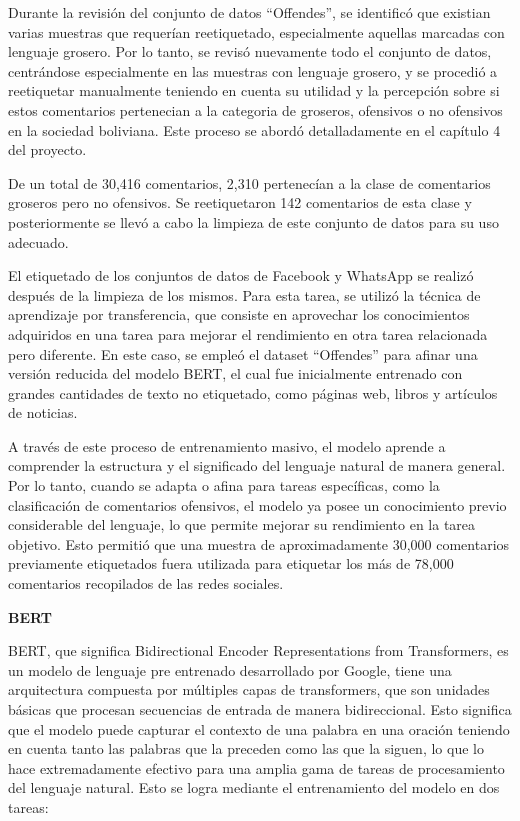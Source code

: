 Durante la revisión del conjunto de datos ``Offendes'', se identificó que existian varias muestras que requerían reetiquetado, especialmente aquellas marcadas con lenguaje grosero. Por lo tanto, se revisó nuevamente todo el conjunto de datos, centrándose especialmente en las muestras con lenguaje grosero, y se procedió a reetiquetar manualmente teniendo en cuenta su utilidad y la percepción sobre si estos comentarios pertenecian a la categoria de groseros, ofensivos o no ofensivos en la sociedad boliviana. Este proceso se abordó detalladamente en el capítulo 4 del proyecto.

De un total de 30,416 comentarios, 2,310 pertenecían a la clase de comentarios groseros pero no ofensivos. Se reetiquetaron 142 comentarios de esta clase y posteriormente se llevó a cabo la limpieza de este conjunto de datos para su uso adecuado.

El etiquetado de los conjuntos de datos de Facebook y WhatsApp se realizó después de la limpieza de los mismos. Para esta tarea, se utilizó la técnica de aprendizaje por transferencia, que consiste en aprovechar los conocimientos adquiridos en una tarea para mejorar el rendimiento en otra tarea relacionada pero diferente. En este caso, se empleó el dataset ``Offendes'' para afinar una versión reducida del modelo BERT, el cual fue inicialmente entrenado con grandes cantidades de texto no etiquetado, como páginas web, libros y artículos de noticias.

A través de este proceso de entrenamiento masivo, el modelo aprende a comprender la estructura y el significado del lenguaje natural de manera general. Por lo tanto, cuando se adapta o afina para tareas específicas, como la clasificación de comentarios ofensivos, el modelo ya posee un conocimiento previo considerable del lenguaje, lo que permite mejorar su rendimiento en la tarea objetivo. Esto permitió que una muestra de aproximadamente 30,000 comentarios previamente etiquetados fuera utilizada para etiquetar los más de 78,000 comentarios recopilados de las redes sociales.

\textbf{BERT}

BERT, que significa Bidirectional Encoder Representations from Transformers, es un modelo de lenguaje pre entrenado desarrollado por Google, tiene una arquitectura compuesta por múltiples capas de transformers, que son unidades básicas que procesan secuencias de entrada de manera bidireccional. Esto significa que el modelo puede capturar el contexto de una palabra en una oración teniendo en cuenta tanto las palabras que la preceden como las que la siguen, lo que lo hace extremadamente efectivo para una amplia gama de tareas de procesamiento del lenguaje natural. Esto se logra mediante el entrenamiento del modelo en dos tareas: 

